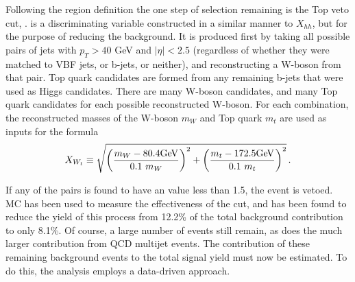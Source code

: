        \FloatBarrier
        Following the region definition the one step of selection remaining is the Top veto cut, \xwt.
        \xwt is a discriminating variable constructed in a similar manner to $X_{hh}$,
            but for the purpose of reducing the \ttbar background.
        It is produced first by taking all possible pairs of jets with $p_T > 40$ GeV and $|\eta| < 2.5$
            (regardless of whether they were matched to VBF jets, or b-jets, or neither),
            and reconstructing a W-boson from that pair.
        Top quark candidates are formed from any remaining b-jets that were used as Higgs candidates.
        There are many W-boson candidates, and many Top quark candidates for each possible reconstructed W-boson.
        For each combination, the reconstructed masses of the W-boson $m_W$ and Top quark $m_t$
            are used as inputs for the formula
        \begin{equation} \label{eq:xwt}
            \xwt \equiv \sqrt{\left(\frac{m_W - 80.4\textrm{GeV}}{0.1 \ m_W}\right)^{2}
                + \left(\frac{m_t - 172.5\textrm{GeV}}{0.1 \ m_t}\right)^{2}}
            \,.
        \end{equation}

        If any of the pairs is found to have an \xwt value less than 1.5, the event is vetoed. 
        \ttbar MC has been used to measure the effectiveness of the \xwt cut,
            and has been found to reduce the yield of this process from
            12.2\% of the total background contribution to only 8.1\%.
        Of course, a large number of \ttbar events still remain,
            as does the much larger contribution from QCD multijet events.
        The contribution of these remaining background events to the total signal yield
            must now be estimated.
        To do this, the analysis employs a data-driven approach.

